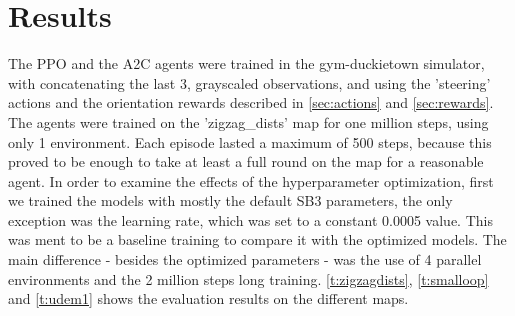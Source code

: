 \documentclass{article}
\begin{document}
\section{\large{Results}}
The PPO and the A2C agents were trained in the gym-duckietown simulator, with concatenating the last 3, grayscaled observations, and using the 'steering' actions and the orientation rewards described in \autoref{sec:actions} and \autoref{sec:rewards}. The agents were trained on the 'zigzag\_dists' map for one million steps, using only 1 environment. Each episode lasted a maximum of 500 steps, because this proved to be enough to take at least a full round on the map for a reasonable agent. In order to examine the effects of the hyperparameter optimization, first we trained the models with mostly the default SB3 parameters, the only exception was the learning rate, which was set to a constant 0.0005 value. This was ment to be a baseline training to compare it with the optimized models. The main difference - besides the optimized parameters - was the use of 4 parallel environments and the 2 million steps long training. \autoref{t:zigzagdists}, \autoref{t:smalloop} and \autoref{t:udem1} shows the evaluation results on the different maps.
\end{document}
